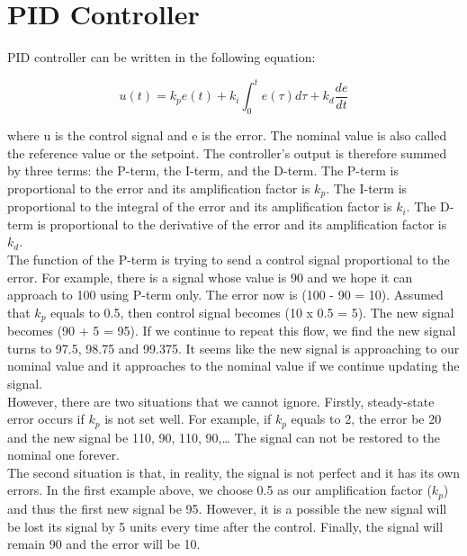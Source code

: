 \section{PID Controller} %
PID controller can be written in the following equation:

\begin{equation} \label{eq3}
u(t) = k_p e(t) + k_i \int_{0}^{t} e(\tau) d\tau + k_d \frac{d e}{d t}
\end{equation}

 where u is the control signal and e is the error. The nominal value is also called the reference value or the setpoint. The controller’s output is therefore summed by three terms: the P-term, the I-term, and the D-term. The P-term is proportional to the error and its amplification factor is $k_p$. The I-term is proportional to the integral of the error and its amplification factor is $k_i$. The D-term is proportional to the derivative of the error and its amplification factor is $k_d$. \\
 
 The function of the P-term is trying to send a control signal proportional to the error. For example, there is a signal whose value is 90 and we hope it can approach to 100 using P-term only. The error now is (100 - 90 = 10). Assumed that $k_p$ equals to 0.5, then control signal becomes (10 x 0.5 = 5). The new signal becomes (90 + 5 = 95). If we continue to repeat this flow, we find the new signal turns to 97.5, 98.75 and 99.375. It seems like the new signal is approaching to our nominal value and it approaches to the nominal value if we continue updating the signal. \\
 

However, there are two situations that we cannot ignore. Firstly, steady-state error occurs if $k_p$ is not set well. For example, if $k_p$ equals to 2, the error be 20 and the new signal be 110, 90, 110, 90,… The signal can not be restored to the nominal one forever.  \\

The second situation is that, in reality, the signal is not perfect and it has its own errors. In the first example above, we choose 0.5 as our amplification factor ($k_p$) and thus the first new signal be 95. However, it is a possible the new signal will be lost its signal by 5 units every time after the control. Finally, the signal will remain 90 and the error will be 10.  \\

